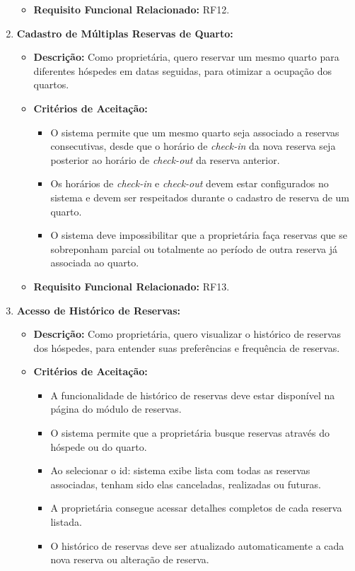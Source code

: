 \documentclass[
	12pt,				%
	openany,			%
	oneside,			%
	a4paper,			%
	english,			%
	french,				%
	spanish,			%
	brazil				%
	]{abntex2}
\begin{document}
\begin{enumerate}[label=\textbf{\arabic*.}]
\begin{itemize}
		\item \textbf{Requisito Funcional Relacionado:} RF12.
	\end{itemize} 
	\item \textbf{Cadastro de Múltiplas Reservas de Quarto:}
	\begin{itemize}
		\item \textbf{Descrição:} Como proprietária, quero reservar um mesmo quarto para diferentes hóspedes em datas seguidas, para otimizar a ocupação dos quartos.
		\item \textbf{Critérios de Aceitação:}
		\begin{itemize}
			\item O sistema permite que um mesmo quarto seja associado a reservas consecutivas, desde que o horário de \textit{check-in} da nova reserva seja posterior ao horário de \textit{check-out} da reserva anterior.
			\item Os horários de \textit{check-in} e \textit{check-out} devem estar configurados no sistema e devem ser respeitados durante o cadastro de reserva de um quarto.
			\item O sistema deve impossibilitar que a proprietária faça reservas que se sobreponham parcial ou totalmente ao período de outra reserva já associada ao quarto.
		\end{itemize}
		\item \textbf{Requisito Funcional Relacionado:} RF13.
	\end{itemize} 
	\item \textbf{Acesso de Histórico de Reservas:}
	\begin{itemize}
		\item \textbf{Descrição:} Como proprietária, quero visualizar o histórico de reservas dos hóspedes, para entender suas preferências e frequência de reservas.
		\item \textbf{Critérios de Aceitação:}
		\begin{itemize}
			\item A funcionalidade de histórico de reservas  deve estar disponível na página do módulo de reservas.
			\item O sistema permite que a proprietária busque reservas através do hóspede ou do quarto.
			\item Ao selecionar o id: sistema exibe lista com todas as reservas associadas, tenham sido elas canceladas, realizadas ou futuras.
			\item A proprietária consegue acessar detalhes completos de cada reserva listada.
			\item O histórico de reservas deve ser atualizado automaticamente a cada nova reserva ou alteração de reserva.

\end{itemize}
\end{itemize}
\end{enumerate}
\end{document}
